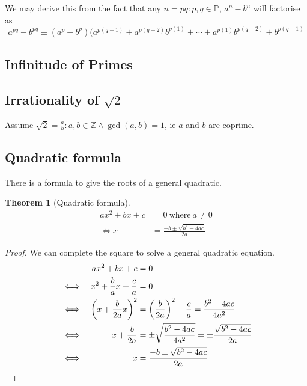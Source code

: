 \documentclass[fleqn,a4paper,11pt]{article}
\newcommand{\setstyle}{\mathbb}
\newcommand{\Integers}{\setstyle Z}
\newtheorem{theorem}{Theorem}[section]
\begin{document}
    We may derive this from the fact that any \(n = pq: p, q \in \mathbb P\),
    \(a^n - b^n\) will factorise as
    \begin{equation}
    a^{pq} - b^{pq} \equiv
     (a^p - b^p)(a^{p(q - 1)} + a^{p(q - 2)}b^{p(1)} + \dotsb +
                 a^{p(1)}b^{p(q - 2)} + b^{p(q - 1)}
    \end{equation}

    \subsection{Infinitude of Primes}

    \subsection[Irrationality of \(\sqrt 2\)]
               {Irrationality of \boldmath\(\sqrt 2\)}

    Assume \(\sqrt 2 = \frac ab : a, b \in \Integers \land \gcd(a, b) = 1\), ie
    \(a\) and \(b\) are coprime.

    \subsection{Quadratic formula} \label{sec_quad_formula}

    There is a formula to give the roots of a general quadratic.
    \begin{theorem}[Quadratic formula]
    \begin{align*}
    ax^2 + bx + c &= 0\ \text{where}\ a \neq 0 \\
    \iff x &= \frac{-b \pm \sqrt{b^2 - 4ac}}{2a}
    \end{align*}
    \end{theorem}
    \begin{proof}
    We can complete the square to solve a general quadratic equation.
    \begin{alignat*}{2}
    &&ax^2 + bx + c &= 0 \\
    &\iff& x^2 + \frac{b}{a}x + \frac{c}{a} &= 0 \\
    &\iff& \pqty{x + \frac{b}{2a}x}^2 &= \pqty{\frac{b}{2a}}^2 - \frac{c}{a}
        = \frac{b^2 - 4ac}{4a^2} \\
    &\iff& x + \frac{b}{2a} &= \pm \sqrt{\frac{b^2 - 4ac}{4a^2}}
        = \pm \frac{\sqrt{b^2 - 4ac}}{2a} \\
    &\iff& x &= \frac{-b \pm \sqrt{b^2 - 4ac}}{2a} \tag*{\qedhere}
    \end{alignat*}
    \end{proof}
\end{document}
